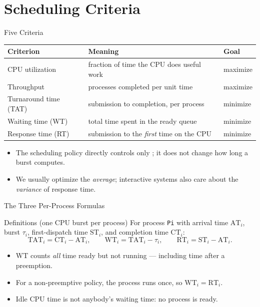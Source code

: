 \documentclass[aspectratio=169]{beamer}
\begin{document}
\section{Scheduling Criteria}

\begin{frame}{Five Criteria}
  \centering
  \footnotesize
  \renewcommand{\arraystretch}{1.3}
  \begin{tabular}{p{}p{}p{}}
    \toprule
    \textbf{Criterion} & \textbf{Meaning} & \textbf{Goal} \\
    \midrule
    CPU utilization & fraction of time the CPU does useful work & maximize \\
    Throughput & processes completed per unit time & maximize \\
    Turnaround time (TAT) & submission to completion, per process & minimize \\
    Waiting time (WT) & total time spent in the ready queue & minimize \\
    Response time (RT) & submission to the \emph{first} time on the CPU & minimize \\
    \bottomrule
  \end{tabular}
  \vspace{0.25cm}
  \begin{itemize}
    \item The scheduling policy directly controls only ; it
      does not change how long a burst computes.
    \item We usually optimize the \emph{average}; interactive systems also
      care about the \emph{variance} of response time.
  \end{itemize}
\end{frame}

\begin{frame}{The Three Per-Process Formulas}
  \begin{block}{Definitions (one CPU burst per process)}
    For process \texttt{Pi} with arrival time $\mathrm{AT}_i$, burst
    $\tau_i$, first-dispatch time $\mathrm{ST}_i$, and completion time
    $\mathrm{CT}_i$:
    \[
      \mathrm{TAT}_i = \mathrm{CT}_i - \mathrm{AT}_i, \qquad
      \mathrm{WT}_i = \mathrm{TAT}_i - \tau_i, \qquad
      \mathrm{RT}_i = \mathrm{ST}_i - \mathrm{AT}_i .
    \]
  \end{block}
  \begin{itemize}
    \item WT counts \emph{all} time ready but not running --- including time
      after a preemption.
    \item For a non-preemptive policy, the process runs once, so
      $\mathrm{WT}_i = \mathrm{RT}_i$.
    \item Idle CPU time is not anybody's waiting time: no process is ready.
  \end{itemize}
\end{frame}
\end{document}
